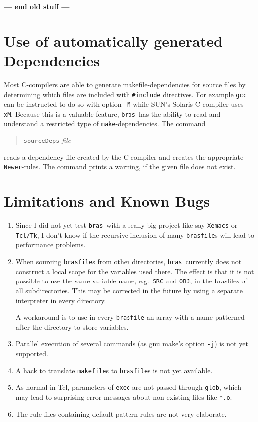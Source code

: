 \documentclass[12pt]{article}
\newcommand{\bras}{\texttt{bras}}
\newcommand{\make}{\texttt{make}}
\begin{document}
{\large\bfseries --- end old stuff ---}


\section{Use of automatically generated Dependencies}

Most C-compilers are able to generate makefile-dependencies for
source files by determining which files are included with
\texttt{\#include} directives. For example \texttt{gcc} can be
instructed to do so with option \texttt{-M} while SUN's Solaris
C-compiler uses \texttt{-xM}. Because this is a valuable feature,
\bras\ has the ability to read and understand a restricted type of
\make-dependencies. The command
\begin{quote}
  \texttt{sourceDeps} \textit{file}
\end{quote}
reads a dependency file created by the C-compiler and creates the
appropriate \texttt{Newer}-rules. The command prints a warning, if
the given file does not exist.
   
\section{Limitations and Known Bugs}


\begin{enumerate}
\item
Since I did not yet test \bras\ with a really big project like say
\texttt{Xemacs} or \texttt{Tcl/Tk}, I don't know if the recursive
inclusion of many \texttt{brasfile}s will lead to performance
problems.

\item
When sourcing \texttt{brasfile}s from other directories, \bras\
currently does not construct a local scope for the variables used
there. The effect is that it is not possible to use the same variable
name, e.g.\ \texttt{SRC} and \texttt{OBJ}, in the brasfiles
of all subdirectories. This may be corrected in the future by using a
separate interpreter in every directory.

A workaround is to use in every \texttt{brasfile} an array with a name
patterned after the directory to store variables.

\item 
Parallel execution of several commands (as gnu make's option
\texttt{-j}) is not yet supported.

\item
A hack to translate \texttt{makefile}s to \texttt{brasfile}s is not
yet available.

\item
As normal in Tcl, parameters of \texttt{exec} are not passed through
\texttt{glob}, which may lead to surprising error messages about
non-existing files like \texttt{*.o}.

\item
The rule-files containing default pattern-rules are not very
elaborate.

\end{enumerate}
\end{document}
